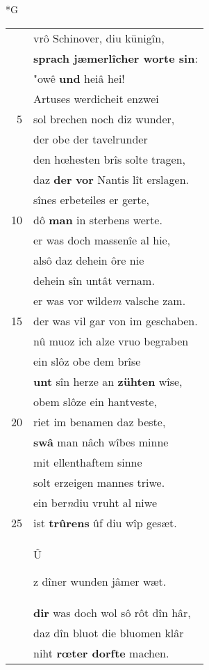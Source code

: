\documentclass[8pt,a4paper,notitlepage]{article}
\begin{document}
\begin{table}[ht]
\begin{minipage}[t]{0.5\linewidth}
\small
\begin{center}*G
\end{center}
\begin{tabular}{rl}
 & vrô Schinover, diu künigîn,\\ 
 & \textbf{sprach jæmerlîcher worte sin}:\\ 
 & "owê \textbf{und} heiâ hei!\\ 
 & Artuses werdicheit enzwei\\ 
5 & sol brechen noch diz wunder,\\ 
 & der obe der tavelrunder\\ 
 & den hœhesten brîs solte tragen,\\ 
 & daz \textbf{der} \textbf{vor} Nantis lît erslagen.\\ 
 & sînes erbeteiles er gerte,\\ 
10 & dô \textbf{man} in sterbens werte.\\ 
 & er was doch massenîe al hie,\\ 
 & alsô daz dehein ôre nie\\ 
 & dehein sîn untât vernam.\\ 
 & er was vor wilde\textit{m} valsche zam.\\ 
15 & der was vil gar von im geschaben.\\ 
 & nû muoz ich alze vruo begraben\\ 
 & ein slôz obe dem brîse\\ 
 & \textbf{unt} sîn herze an \textbf{zühten} wîse,\\ 
 & obem slôze ein hantveste,\\ 
20 & riet im benamen daz beste,\\ 
 & \textbf{swâ} man nâch wîbes minne\\ 
 & mit ellenthaftem sinne\\ 
 & solt erzeigen mannes triwe.\\ 
 & ein ber\textit{n}diu vruht al niwe\\ 
25 & ist \textbf{trûrens} ûf diu wîp gesæt.\\ 
 & \begin{large}Û\end{large}z dîner wunden jâmer wæt.\\ 
 & \textbf{dir} was doch wol sô rôt dîn hâr,\\ 
 & daz dîn bluot die bluomen klâr\\ 
 & niht \textbf{rœter dorfte} machen.\\ 

\end{tabular}
\end{minipage}
\end{table}
\end{document}
